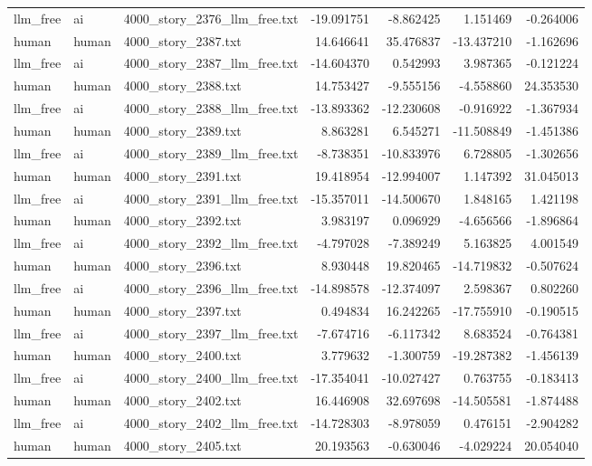 \begin{longtable}{lllrrrr}
llm\_free & ai & 4000\_story\_2376\_llm\_free.txt & -19.091751 & -8.862425 & 1.151469 & -0.264006 \\
human & human & 4000\_story\_2387.txt & 14.646641 & 35.476837 & -13.437210 & -1.162696 \\
llm\_free & ai & 4000\_story\_2387\_llm\_free.txt & -14.604370 & 0.542993 & 3.987365 & -0.121224 \\
human & human & 4000\_story\_2388.txt & 14.753427 & -9.555156 & -4.558860 & 24.353530 \\
llm\_free & ai & 4000\_story\_2388\_llm\_free.txt & -13.893362 & -12.230608 & -0.916922 & -1.367934 \\
human & human & 4000\_story\_2389.txt & 8.863281 & 6.545271 & -11.508849 & -1.451386 \\
llm\_free & ai & 4000\_story\_2389\_llm\_free.txt & -8.738351 & -10.833976 & 6.728805 & -1.302656 \\
human & human & 4000\_story\_2391.txt & 19.418954 & -12.994007 & 1.147392 & 31.045013 \\
llm\_free & ai & 4000\_story\_2391\_llm\_free.txt & -15.357011 & -14.500670 & 1.848165 & 1.421198 \\
human & human & 4000\_story\_2392.txt & 3.983197 & 0.096929 & -4.656566 & -1.896864 \\
llm\_free & ai & 4000\_story\_2392\_llm\_free.txt & -4.797028 & -7.389249 & 5.163825 & 4.001549 \\
human & human & 4000\_story\_2396.txt & 8.930448 & 19.820465 & -14.719832 & -0.507624 \\
llm\_free & ai & 4000\_story\_2396\_llm\_free.txt & -14.898578 & -12.374097 & 2.598367 & 0.802260 \\
human & human & 4000\_story\_2397.txt & 0.494834 & 16.242265 & -17.755910 & -0.190515 \\
llm\_free & ai & 4000\_story\_2397\_llm\_free.txt & -7.674716 & -6.117342 & 8.683524 & -0.764381 \\
human & human & 4000\_story\_2400.txt & 3.779632 & -1.300759 & -19.287382 & -1.456139 \\
llm\_free & ai & 4000\_story\_2400\_llm\_free.txt & -17.354041 & -10.027427 & 0.763755 & -0.183413 \\
human & human & 4000\_story\_2402.txt & 16.446908 & 32.697698 & -14.505581 & -1.874488 \\
llm\_free & ai & 4000\_story\_2402\_llm\_free.txt & -14.728303 & -8.978059 & 0.476151 & -2.904282 \\
human & human & 4000\_story\_2405.txt & 20.193563 & -0.630046 & -4.029224 & 20.054040 \\

\end{longtable}
